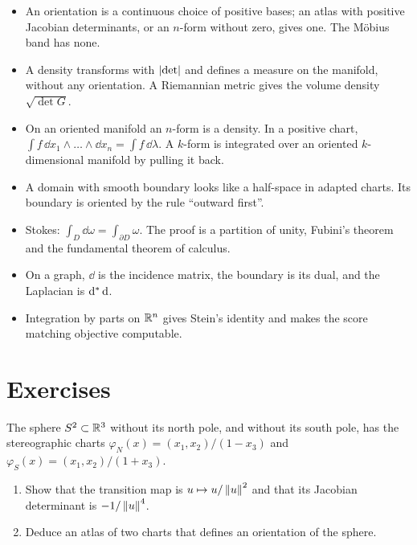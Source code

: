 \begin{notechapter}
\begin{chaptersummary}
\begin{itemize}[nosep]
  \item An orientation is a continuous choice of positive bases; an
        atlas with positive Jacobian determinants, or an $n$-form
        without zero, gives one. The M\"obius band has none.
  \item A density transforms with $\left|\det\right|$ and defines a measure on
        the manifold, without any orientation. A Riemannian metric
        gives the volume density $\sqrt{\det G}$.
  \item On an oriented manifold an $n$-form is a density. In a positive
        chart, $\int f\,\dd x_1\wedge\dots\wedge\dd x_n
        = \int f\,\dd\lambda$. A $k$-form is integrated over an
        oriented $k$-dimensional manifold by pulling it back.
  \item A domain with smooth boundary looks like a half-space in
        adapted charts. Its boundary is oriented by the rule ``outward
        first''.
  \item Stokes: $\int_D\dd\omega = \int_{\partial D}\omega$. The proof
        is a partition of unity, Fubini's theorem and the fundamental
        theorem of calculus.
  \item On a graph, $\dd$ is the incidence matrix, the boundary is its
        dual, and the Laplacian is $\mathrm{d}^{*}\,\mathrm{d}$.
  \item Integration by parts on $\mathbb{R}^n$ gives Stein's identity and makes
        the score matching objective computable.
\end{itemize}
\end{chaptersummary}

\section*{Exercises}

\begin{exercise}\label{stokes:exr:1}
The sphere $S^2\subset\mathbb{R}^3$ without its north pole, and without its
south pole, has the stereographic charts
$\varphi_N(x) = (x_1, x_2)/(1 - x_3)$ and
$\varphi_S(x) = (x_1, x_2)/(1 + x_3)$.
\begin{enumerate}[nosep]
  \item Show that the transition map is $u\mapsto u/\left\|u\right\|^2$ and
        that its Jacobian determinant is $-1/\left\|u\right\|^4$.
  \item Deduce an atlas of two charts that defines an orientation of
        the sphere.
\end{enumerate}
\end{exercise}


\end{notechapter}
